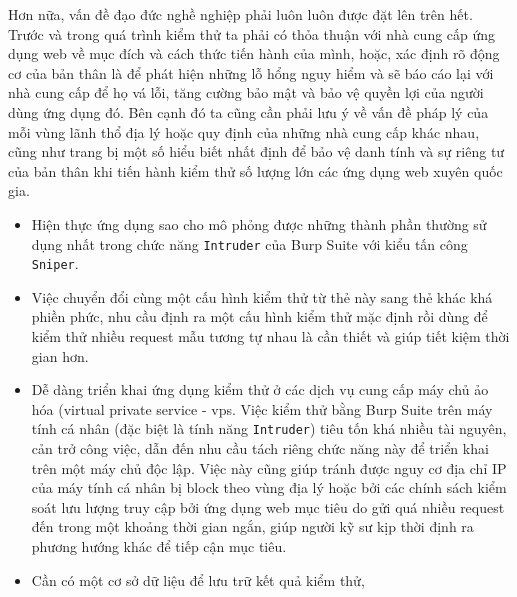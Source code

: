 Hơn nữa, vấn đề đạo đức nghề nghiệp phải luôn luôn được đặt lên trên hết. Trước và trong quá trình kiểm thử ta phải có thỏa thuận với nhà cung cấp ứng dụng web về mục đích và cách thức tiến hành của mình, hoặc, xác định rõ động cơ của bản thân là để phát hiện những lỗ hổng nguy hiểm và sẽ báo cáo lại với nhà cung cấp để họ vá lỗi, tăng cường bảo mật và bảo vệ quyền lợi của người dùng ứng dụng đó. Bên cạnh đó ta cũng cần phải lưu ý về vấn đề pháp lý của mỗi vùng lãnh thổ địa lý hoặc quy định của những nhà cung cấp khác nhau, cũng như trang bị một số hiểu biết nhất định để bảo vệ danh tính và sự riêng tư của bản thân khi tiến hành kiểm thử số lượng lớn các ứng dụng web xuyên quốc gia.\par

\begin{itemize}
    \item Hiện thực ứng dụng sao cho mô phỏng được những thành phần thường sử dụng nhất trong chức năng \texttt{Intruder} của Burp Suite với kiểu tấn công \texttt{Sniper}. 
    \item Việc chuyển đổi cùng một cấu hình kiểm thử từ thẻ này sang thẻ khác khá phiền phức, nhu cầu định ra một cấu hình kiểm thử mặc định rồi dùng để kiểm thử nhiều request mẫu tương tự nhau là cần thiết và giúp tiết kiệm thời gian hơn.
    \item Dễ dàng triển khai ứng dụng kiểm thử ở các dịch vụ cung cấp máy chủ ảo hóa (virtual private service - \acrshort{vps}. Việc kiểm thử bằng Burp Suite trên máy tính cá nhân (đặc biệt là tính năng \texttt{Intruder}) tiêu tốn khá nhiều tài nguyên, cản trở công việc, dẫn đến nhu cầu tách riêng chức năng này để triển khai trên một máy chủ độc lập. Việc này cũng giúp tránh được nguy cơ địa chỉ IP của máy tính cá nhân bị block theo vùng địa lý hoặc bởi các chính sách kiểm soát lưu lượng truy cập bởi ứng dụng web mục tiêu do gửi quá nhiều request đến trong một khoảng thời gian ngắn, giúp người kỹ sư kịp thời định ra phương hướng khác để tiếp cận mục tiêu.
    \item Cần có một cơ sở dữ liệu để lưu trữ kết quả kiểm thử,
\end{itemize}


